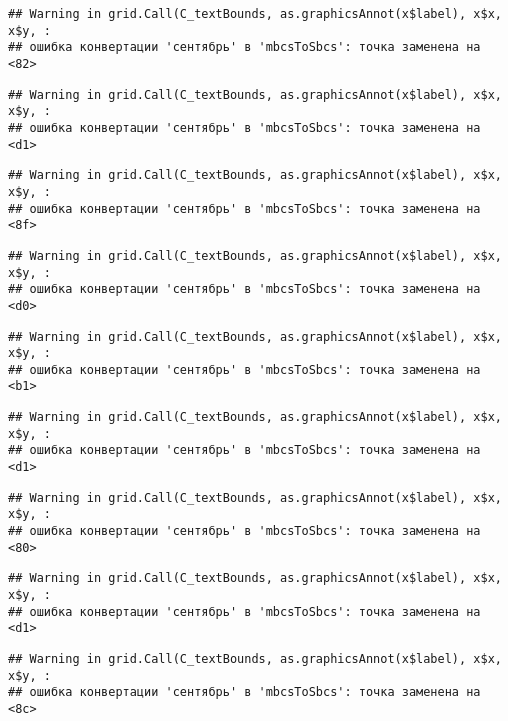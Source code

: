 \documentclass[
]{article}
\begin{document}
\begin{verbatim}
## Warning in grid.Call(C_textBounds, as.graphicsAnnot(x$label), x$x, x$y, :
## ошибка конвертации 'сентябрь' в 'mbcsToSbcs': точка заменена на <82>
\end{verbatim}

\begin{verbatim}
## Warning in grid.Call(C_textBounds, as.graphicsAnnot(x$label), x$x, x$y, :
## ошибка конвертации 'сентябрь' в 'mbcsToSbcs': точка заменена на <d1>
\end{verbatim}

\begin{verbatim}
## Warning in grid.Call(C_textBounds, as.graphicsAnnot(x$label), x$x, x$y, :
## ошибка конвертации 'сентябрь' в 'mbcsToSbcs': точка заменена на <8f>
\end{verbatim}

\begin{verbatim}
## Warning in grid.Call(C_textBounds, as.graphicsAnnot(x$label), x$x, x$y, :
## ошибка конвертации 'сентябрь' в 'mbcsToSbcs': точка заменена на <d0>
\end{verbatim}

\begin{verbatim}
## Warning in grid.Call(C_textBounds, as.graphicsAnnot(x$label), x$x, x$y, :
## ошибка конвертации 'сентябрь' в 'mbcsToSbcs': точка заменена на <b1>
\end{verbatim}

\begin{verbatim}
## Warning in grid.Call(C_textBounds, as.graphicsAnnot(x$label), x$x, x$y, :
## ошибка конвертации 'сентябрь' в 'mbcsToSbcs': точка заменена на <d1>
\end{verbatim}

\begin{verbatim}
## Warning in grid.Call(C_textBounds, as.graphicsAnnot(x$label), x$x, x$y, :
## ошибка конвертации 'сентябрь' в 'mbcsToSbcs': точка заменена на <80>
\end{verbatim}

\begin{verbatim}
## Warning in grid.Call(C_textBounds, as.graphicsAnnot(x$label), x$x, x$y, :
## ошибка конвертации 'сентябрь' в 'mbcsToSbcs': точка заменена на <d1>
\end{verbatim}

\begin{verbatim}
## Warning in grid.Call(C_textBounds, as.graphicsAnnot(x$label), x$x, x$y, :
## ошибка конвертации 'сентябрь' в 'mbcsToSbcs': точка заменена на <8c>
\end{verbatim}
\end{document}
